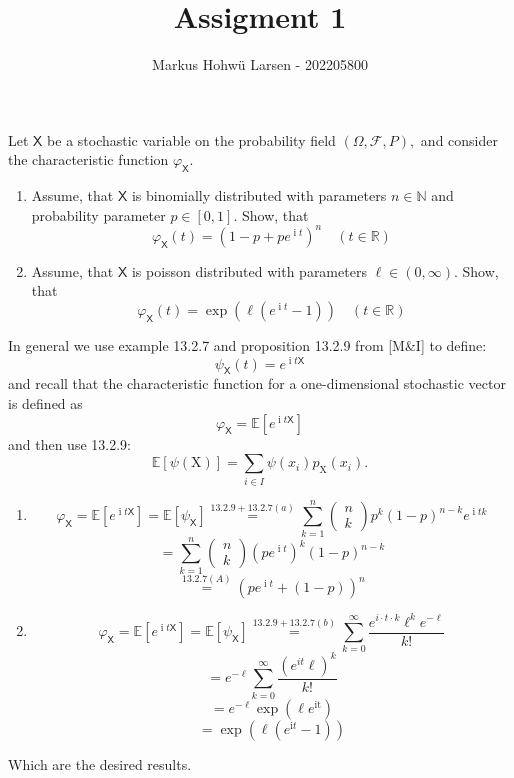 \documentclass{Class}
\title{Assigment 1}
\author{Markus Hohwü Larsen - 202205800}
\newcommand{\N}{\mathbb{N}}
\newcommand{\R}{\mathbb{R}}
\newcommand{\E}{\mathbb{E}}
\newcommand{\1}{\mathbbm{1}}
\newcommand{\X}{\mathsf{X}}
\newcommand{\icomp}{\operatorname{i}}
\newcommand{\varx}{\varphi_\X}
\newcommand{\pfield}{(\Omega, \mathcal{F}, P)}
\theoremstyle{boxed}
\begin{document}
Let $\X$ be a stochastic variable on the probability field $\pfield,$ and consider the characteristic function $\varx$. 
\begin{enumerate}
  \item Assume, that $\X$ is binomially distributed with parameters $n\in\N$ and probability parameter $p\in[0,1].$ Show, that $$\varx(t)=(1-p+pe^{\icomp t})^n\quad (t\in\R)$$
  \item Assume, that $\X$ is poisson distributed with parameters $\ell\in (0,\infty)$. Show, that $$\varx(t)=\exp(\ell(e^{\icomp t}-1)) \quad (t\in\R)$$
\end{enumerate}
\solution
In general we use example 13.2.7 and proposition 13.2.9 from [M\&I] to define:
  $$\psi_{\X}(t)=e^{\icomp t\X}$$
  and recall that the characteristic function for a one-dimensional stochastic vector is defined as $$\varx = \E\left[e^{\icomp t\X}\right]$$
  and then use 13.2.9:
  $$\mathbb{E}[\psi(\mathrm{X})]=\sum_{i \in I} \psi\left(x_i\right) p_{\mathrm{X}}\left(x_i\right).$$
\begin{enumerate}
  \item $$\varx=\E[e^{\icomp t\X}]=\E[\psi_\X]\stackrel{13.2.9+13.2.7(a)}{=}\sum_{k=1}^n \begin{pmatrix}
    n\\k
  \end{pmatrix}p^k(1-p)^{n-k}e^{\icomp tk} $$
  $$=\sum_{k=1}^n \begin{pmatrix}
    n\\k
  \end{pmatrix}(pe^{\icomp t})^k(1-p)^{n-k}$$
  $$\stackrel{13.2.7(A)}{=}(pe^{\icomp t}+(1-p))^n$$
  \item $$\varx=\E[e^{\icomp t\X}]=\E[\psi_\X]\stackrel{13.2.9+13.2.7(b)}{=}\sum_{k=0}^{\infty} \frac{e^{i \cdot t \cdot k} \ell^k e^{-\ell}}{k!}$$$$=e^{-\ell} \sum_{k=0}^{\infty} \frac{\left(e^{i t} \ell\right)^k}{k!}$$$$
  =e^{-\ell} \exp \left(\ell e^{\mathrm{it}}\right)$$$$=\exp \left(\ell\left(e^{\mathrm{i} t}-1\right)\right)
  $$
  
\end{enumerate}
Which are the desired results.
\end{document}
